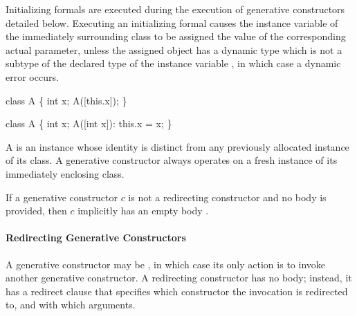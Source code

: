 \documentclass[makeidx]{article}
\begin{document}
\LMHash{}%
Initializing formals are executed during
the execution of generative constructors detailed below.
Executing an initializing formal 
causes the instance variable \id{} of the immediately surrounding class
to be assigned the value of the corresponding actual parameter,
unless the assigned object has a dynamic type
which is not a subtype of the declared type of the instance variable \id,
in which case a dynamic error occurs.


\begin{dartCode}
class A \{
  int x;
  A([this.x]);
\}
\end{dartCode}


\begin{dartCode}
class A \{
  int x;
  A([int x]): this.x = x;
\}
\end{dartCode}

\LMHash{}%
A  is an instance whose identity is distinct from
any previously allocated instance of its class.
A generative constructor always operates on a fresh instance of
its immediately enclosing class.


\LMHash{}%
If a generative constructor $c$ is not a redirecting constructor
and no body is provided, then $c$ implicitly has an empty body \code{\{\}}.


\paragraph{Redirecting Generative Constructors}

\LMHash{}%
A generative constructor may be
,
in which case its only action is to invoke another generative constructor.
A redirecting constructor has no body;
instead, it has a redirect clause that specifies
which constructor the invocation is redirected to,
and with which arguments.
\end{document}
